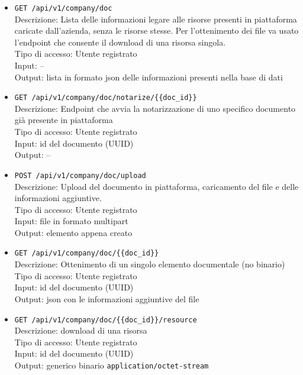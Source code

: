 \documentclass[a4paper,11pt]{article}
\begin{document}
\begin{itemize}
  \item \texttt{GET /api/v1/company/doc}
        \\ Descrizione: Lista delle informazioni legare alle risorse presenti in piattaforma caricate dall'azienda, senza le risorse stesse. Per l'ottenimento dei file va usato l'endpoint che consente il download di una risorsa singola.
        \\ Tipo di accesso: Utente registrato
        \\ Input: --
        \\ Output: lista in formato json delle informazioni presenti nella base di dati

  \item \texttt{GET /api/v1/company/doc/notarize/\{\{doc\_id\}\}}
        \\ Descrizione: Endpoint che avvia la notarizzazione di uno specifico documento già presente in piattaforma
        \\ Tipo di accesso: Utente registrato
        \\ Input: id del documento (UUID)
        \\ Output: --

  \item \texttt{POST /api/v1/company/doc/upload}
        \\ Descrizione: Upload del documento in piattaforma, caricamento del file e delle informazioni aggiuntive.
        \\ Tipo di accesso: Utente registrato
        \\ Input: file in formato multipart
        \\ Output: elemento appena creato

  \item \texttt{GET /api/v1/company/doc/\{\{doc\_id\}\}}
        \\ Descrizione: Ottenimento di un singolo elemento documentale (no binario)
        \\ Tipo di accesso: Utente registrato
        \\ Input: id del documento (UUID)
        \\ Output: json con le informazioni aggiuntive del file

  \item \texttt{GET /api/v1/company/doc/\{\{doc\_id\}\}/resource}
        \\ Descrizione: download di una risorsa
        \\ Tipo di accesso: Utente registrato
        \\ Input: id del documento (UUID)
        \\ Output: generico binario \texttt{application/octet-stream}


\end{itemize}
\end{document}
